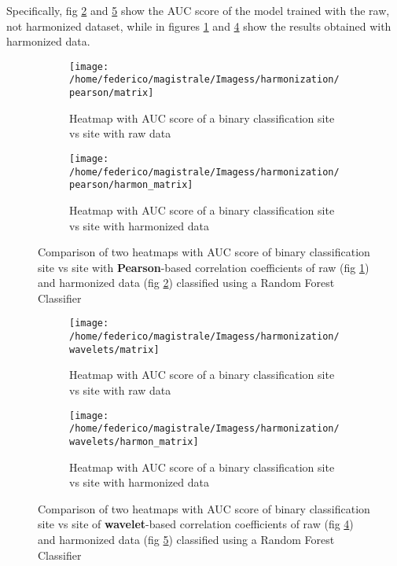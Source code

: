 \documentclass[11pt]{report}
\begin{document}
Specifically, fig \ref{fig:heatmap_harmonization_noharmon} and \ref{fig:heatmap_harmonization_noharmon_w} show the AUC score of the model trained with the raw, not harmonized dataset, while in figures \ref{fig:heatmap_harmonization_harmon} and \ref{fig:heatmap_harmonization_harmon_w} show the results obtained with harmonized data.



\begin{figure}
\centering
\begin{subfigure}[b]{0.8\textwidth}
   \texttt{[image: /home/federico/magistrale/Imagess/harmonization/pearson/matrix]}
   \caption{Heatmap with AUC score of a binary classification site vs site with raw data}
   \label{fig:heatmap_harmonization_harmon}
\end{subfigure}

\begin{subfigure}[b]{0.8\textwidth}
   \texttt{[image: /home/federico/magistrale/Imagess/harmonization/pearson/harmon\_matrix]}
   \caption{Heatmap with AUC score of a binary classification site vs site with harmonized data}
   \label{fig:heatmap_harmonization_noharmon}
\end{subfigure}

\caption{Comparison of two heatmaps with AUC score of binary classification site vs site with \textbf{Pearson}-based correlation coefficients of raw (fig \ref{fig:heatmap_harmonization_harmon}) and harmonized data (fig \ref{fig:heatmap_harmonization_noharmon}) classified using a Random Forest Classifier
}
\label{fig:heatmap_harmonization}
\end{figure}



\begin{figure}
\centering
\begin{subfigure}[b]{0.70\textwidth}
   \texttt{[image: /home/federico/magistrale/Imagess/harmonization/wavelets/matrix]}
   \caption{Heatmap with AUC score of a binary classification site vs site with raw data}
   \label{fig:heatmap_harmonization_harmon_w}
\end{subfigure}

\begin{subfigure}[b]{0.70\textwidth}
   \texttt{[image: /home/federico/magistrale/Imagess/harmonization/wavelets/harmon\_matrix]}
   \caption{Heatmap with AUC score of a binary classification site vs site with harmonized data}
   \label{fig:heatmap_harmonization_noharmon_w}
\end{subfigure}

\caption{Comparison of two heatmaps with AUC score of binary classification site vs site of \textbf{wavelet}-based correlation coefficients of raw (fig \ref{fig:heatmap_harmonization_harmon_w}) and harmonized data (fig \ref{fig:heatmap_harmonization_noharmon_w}) classified using a Random Forest Classifier
}
\label{fig:heatmap_harmonization_w}
\end{figure}
\end{document}
